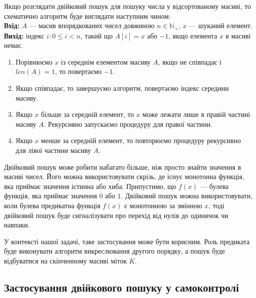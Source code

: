 Якщо розглядати двійковий пошук для пошуку числа у відсортованому масиві, то схематично алгоритм
буде виглядати наступним чином:\\
\textbf{Вхід:} $A$ --- масив впорядкованих чисел довжиною $n\in\mathbb{N}_+$, $x$ --- шуканий елемент.\\
\textbf{Вихід:} індекс $i:0\leq i < n$, такий що $A[i]=x$ або $-1$, якщо елемента $x$ в масиві немає.
\begin{enumerate}
    \item Порівнюємо $x$ із середнім елементом масиву $A$, якщо не співпадає і $len(A)=1$, то повертаємо $-1$.
    \item Якщо співпадає, то завершуємо алгоритм, повертаємо індекс середини масиву.
    \item Якщо $x$ більше за середній елемент, то $x$ може лежати лише в правій частині масиву $A$. Рекурсивно запускаємо процедуру для правої частини.
    \item Якщо $x$ менше за середній елемент, то повторюємо процедуру рекурсивно для лівої частини масиву $A$. 
\end{enumerate}

Двійковий пошук може робити набагато більше, ніж просто знайти значення в масиві чисел. Його можна використовувати 
скрізь, де існує монотонна функція, яка приймає значення істинна або хиба.
Припустимо, що $f(x)$ --- булева функція, яка приймає значення $0$ або $1$.
Двійковий пошук можна використовувати, коли булева предикатна функція $f(x)$ є
монотонною за змінною $x$, тоді двійковий пошук буде сигналізувати про перехід від 
нулів до одиничок чи навпаки. 

У контексті нашої задачі, таке застосування може бути корисним. Роль предиката буде виконувати 
алгоритм викреслювання другого порядку, а пошук буде відбуватися на скінченному масиві міток $K$.

\subsection{Застосування двійкового пошуку у самоконтролі}


